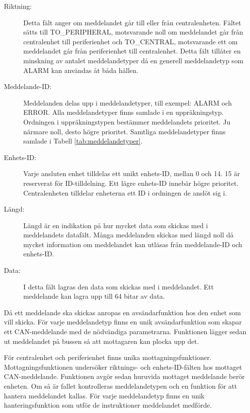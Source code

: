 \documentclass[a4paper]{article}
\begin{document}
\begin{description}
    \item[Riktning:] Detta fält anger om meddelandet går till eller från centralenheten.
    Fältet sätts till TO\_PERIPHERAL, motsvarande noll om meddelandet går från centralenhet till periferienhet och TO\_CENTRAL, motsvarande ett om meddelandet går från periferienhet till centralenhet.
    Detta fält tillåter en minskning av antalet meddelandetyper då en generell meddelandetyp som ALARM kan användas åt båda hållen.

    \item[Meddelande-ID:] Meddelanden delas upp i meddelandetyper, till exempel: ALARM och ERROR.
    Alla meddelandetyper finns samlade i en uppräkningstyp.
    Ordningen i uppräkningstypen bestämmer meddelandets prioritet.
    Ju närmare noll, desto högre prioritet.
    Samtliga meddelandetyper finns samlade i Tabell \ref{tab:meddelandetyper}.

    \item[Enhets-ID:] Varje ansluten enhet tilldelas ett unikt enhets-ID, mellan 0 och 14.
    15 är reserverat för ID-tilldelning. Ett lägre enhets-ID innebär högre prioritet.
    Centralenheten tilldelar enheterna ett ID i ordningen de anslöt sig i.

    \item[Längd:] Längd är en indikation på hur mycket data som skickas med i meddelandets datafält.
    Många meddelanden skickas med längd noll då mycket information om meddelandet kan utläsas från meddelande-ID och enhets-ID.

    \item[Data:] I detta fält lagras den data som skickas med i meddelandet.
    Ett meddelande kan lagra upp till 64 bitar av data.
\end{description}

Då ett meddelande ska skickas anropas en avsändarfunktion hos den enhet som vill skicka.
För varje meddelandetyp finns en unik avsändarfunktion som skapar ett CAN-meddelande med de nödvändiga parametrarna.
Funktionen lägger sedan ut meddelandet på bussen så att mottagaren kan plocka upp det.

För centralenhet och periferienhet finns unika mottagningsfunktioner.
Mottagningsfunktionen undersöker riktnings- och enhets-ID-fälten hos mottaget CAN-meddelande.
Funktionen avgör sedan huruvida mottaget meddelande berör enheten.
Om så är fallet kontrolleras meddelandetypen och en funktion för att hantera meddelandet kallas.
För varje meddelandetyp finns en unik hanteringsfunktion som utför de instruktioner meddelandet medförde.
\end{document}

